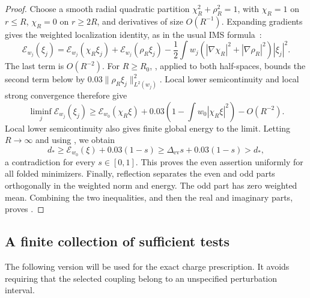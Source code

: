 \begin{proof}
Choose a smooth radial quadratic partition
\(\chi_R^2+\rho_R^2=1\), with \(\chi_R=1\) on \(r\le R\),
\(\chi_R=0\) on \(r\ge2R\), and derivatives of size \(O(R^{-1})\).
Expanding gradients gives the weighted localization identity, as in
the usual IMS formula~\cite[Section~3, Lemma~3.1]{Simon83}:
\[
 \mathcal E_{w_j}(\xi_j)
 =\mathcal E_{w_j}(\chi_R\xi_j)
  +\mathcal E_{w_j}(\rho_R\xi_j)
  -\frac12\int w_j
       (|\nabla\chi_R|^2+|\nabla\rho_R|^2)|\xi_j|^2.
\]
The last term is \(O(R^{-2})\).  For \(R\ge R_0\),
, applied to both half-spaces, bounds
the second term below by \(0.03\|\rho_R\xi_j\|_{L^2(w_j)}^2\).
Local lower semicontinuity and local strong convergence therefore
give
\[
 \liminf_j\mathcal E_{w_j}(\xi_j)
 \ge \mathcal E_{w_0}(\chi_R\xi)
      +0.03\left(1-\int w_0|\chi_R\xi|^2\right)-O(R^{-2}).
\]
Local lower semicontinuity also gives finite global energy to the
limit.  Letting \(R\to\infty\) and using
, we obtain
\[
 d_*\ge\mathcal E_{w_0}(\xi)+0.03(1-s)
       \ge\Delta_{\mathrm{ev}}s+0.03(1-s)>d_*,
\]
a contradiction for every \(s\in[0,1]\).
This proves the even assertion uniformly for all folded minimizers.
Finally, reflection separates the even and odd parts orthogonally
in the weighted norm and energy.  The odd part has zero weighted
mean.  Combining the two inequalities, and then the real and
imaginary parts, proves .
\end{proof}

\subsection{A finite collection of sufficient tests}

The following version will be used for the exact charge prescription.
It avoids requiring that the selected coupling belong to an
unspecified perturbation interval.

